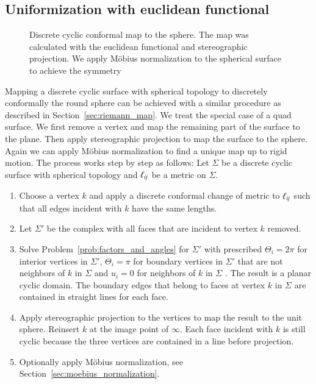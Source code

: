 \documentclass[Thesis]{subfiles}
\begin{document}
\subsection{Uniformization with euclidean functional}
\label{sec:spheres_euclidean}

\begin{figure}
\centering
{}
\caption{
Discrete cyclic conformal map to the sphere. 
The map was calculated with the euclidean functional and stereographic projection.
We apply M{\"o}bius normalization to the spherical surface to achieve the symmetry
}
\label{fig:spherical_circular}
\end{figure}

Mapping a discrete cyclic surface with spherical topology to discretely conformally the round sphere can be achieved with a similar procedure as described in Section~\ref{sec:riemann_map}. 
We treat the special case of a quad surface.
We first remove a vertex and map the remaining part of the surface to the plane.
Then apply stereographic projection to map the surface to the sphere.
Again we can apply M{\"o}bius normalization to find a unique map up to rigid motion.
The process works step by step as follows: Let $\Sigma$ be a discrete cyclic surface with spherical topology and $\ell_{\it ij}$ be a metric on $\Sigma$.
\begin{enumerate}
\item 
Choose a vertex $k$ and apply a discrete conformal change of metric to $\ell_{\it ij}$ such that all edges incident with $k$ have the same lengths.
\item
Let $\Sigma'$ be the complex with all faces that are incident to vertex $k$ removed.
\item
Solve Problem~\ref{prob:factors_and_angles} for $\Sigma'$ with prescribed $\Theta_i=2\pi$ for interior vertices in $\Sigma'$, $\Theta_i=\pi$ for boundary vertices in $\Sigma'$ that are not neighbors of $k$ in $\Sigma$ and $u_i=0$ for neighbors of $k$ in $\Sigma$ . 
The result is a planar cyclic domain. 
The boundary edges that belong to faces at vertex $k$ in $\Sigma$ are contained in straight lines for each face.
\item
Apply stereographic projection to the vertices to map the result to the unit sphere.
Reinsert $k$ at the image point of $\infty$.
Each face incident with $k$ is still cyclic because the three vertices are contained in a line before projection.
\item
Optionally apply M{\"o}bius normalization, see Section~\ref{sec:moebius_normalization}. 
\end{enumerate} 
\end{document}
